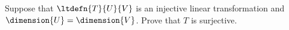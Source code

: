 Suppose that $\ltdefn{T}{U}{V}$ is an injective linear transformation and $\dimension{U}=\dimension{V}$.  Prove that $T$ is surjective.